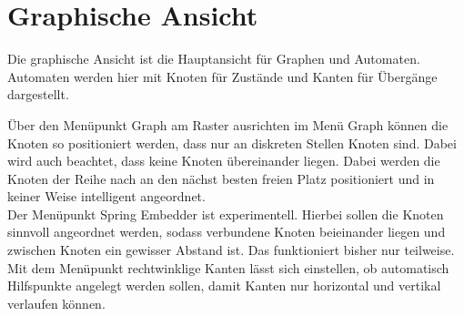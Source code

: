 \section{Graphische Ansicht}
Die graphische Ansicht ist die Hauptansicht für Graphen und Automaten. Automaten werden hier mit Knoten für Zustände und Kanten für Übergänge dargestellt.

Über den Menüpunkt Graph am Raster ausrichten im Menü Graph können die Knoten so positioniert werden, dass nur an diskreten Stellen Knoten sind. Dabei wird auch beachtet, dass keine Knoten übereinander liegen. Dabei werden die Knoten der Reihe nach an den nächst besten freien Platz positioniert und in keiner Weise intelligent angeordnet.\\
Der Menüpunkt Spring Embedder ist experimentell. Hierbei sollen die Knoten sinnvoll angeordnet werden, sodass verbundene Knoten beieinander liegen und zwischen Knoten ein gewisser Abstand ist. Das funktioniert bisher nur teilweise.\\
Mit dem Menüpunkt rechtwinklige Kanten lässt sich einstellen, ob automatisch Hilfspunkte angelegt werden sollen, damit Kanten nur horizontal und vertikal verlaufen können.

